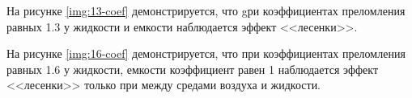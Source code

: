 \begin{figure}[ht!]
\end{figure}

На рисунке \ref{img:13-coef} демонстрируется, что gри коэффициентах преломления равных 1.3 у жидкости и емкости наблюдается эффект <<лесенки>>.

\begin{figure}[ht!]
\end{figure}

На рисунке \ref{img:16-coef} демонстрируется, что при коэффициентах преломления равных 1.6 у жидкости, емкости коэффициент равен 1 наблюдается эффект <<лесенки>> только при между средами воздуха и жидкости.

\begin{figure}[ht!]
\end{figure}


